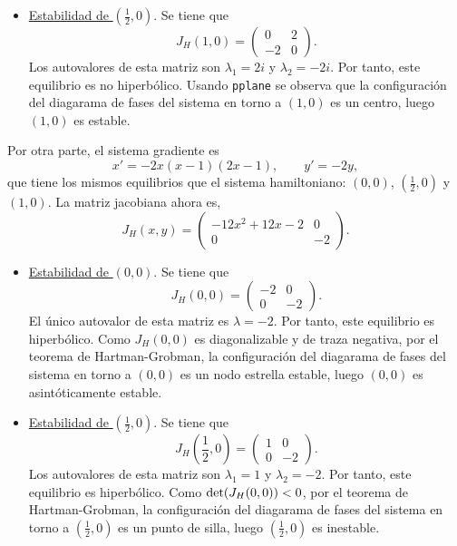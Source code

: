 \documentclass[11pt]{report}
\begin{document}
\begin{solution}
\begin{enumerate}
\begin{itemize}
            \item \underline{Estabilidad de $(\frac{1}{2},0)$}. Se tiene que
            \[J_H(1,0) = \left(\begin{array}{cc}
                0 & 2 \\
                -2 & 0
            \end{array}\right).\]
            Los autovalores de esta matriz son $\lambda_1 = 2i$ y $\lambda_2 = -2i$. Por tanto, este equilibrio es no hiperbólico. Usando \texttt{pplane} se observa que la configuración del diagarama de fases del sistema en torno a $(1,0)$ es un centro, luego $(1,0)$ es estable.
        \end{itemize}
        Por otra parte, el sistema gradiente es
        \[x' = -2x(x-1)(2x-1), \qquad y' = -2y,\]
        que tiene los mismos equilibrios que el sistema hamiltoniano: $(0,0)$, $(\frac{1}{2},0)$ y $(1,0)$. La matriz jacobiana ahora es,
        \[J_H(x,y) = \left(\begin{array}{cc}
            -12x^2+12x-2 & 0 \\
            0 & -2
        \end{array}\right).\]
        \begin{itemize}
            \item \underline{Estabilidad de $(0,0)$}. Se tiene que
            \[J_H(0,0) = \left(\begin{array}{cc}
                -2 & 0 \\
                0 & -2
            \end{array}\right).\]
            El único autovalor de esta matriz es $\lambda = -2$. Por tanto, este equilibrio es hiperbólico. Como $J_H(0,0)$ es diagonalizable y de traza negativa, por el teorema de Hartman-Grobman, la configuración del diagarama de fases del sistema en torno a $(0,0)$ es un nodo estrella estable, luego $(0,0)$ es asintóticamente estable.
            \item \underline{Estabilidad de $(\frac{1}{2},0)$}. Se tiene que
            \[J_H(\frac{1}{2},0) = \left(\begin{array}{cc}
                1 & 0 \\
                0 & -2
            \end{array}\right).\]
            Los autovalores de esta matriz son $\lambda_1 = 1$ y $\lambda_2 = -2$. Por tanto, este equilibrio es hiperbólico. Como $\textup{det}(J_H(0,0)) < 0$, por el teorema de Hartman-Grobman, la configuración del diagarama de fases del sistema en torno a $(\frac{1}{2},0)$ es un punto de silla, luego $(\frac{1}{2},0)$ es inestable.

\end{itemize}
\end{enumerate}
\end{solution}
\end{document}
